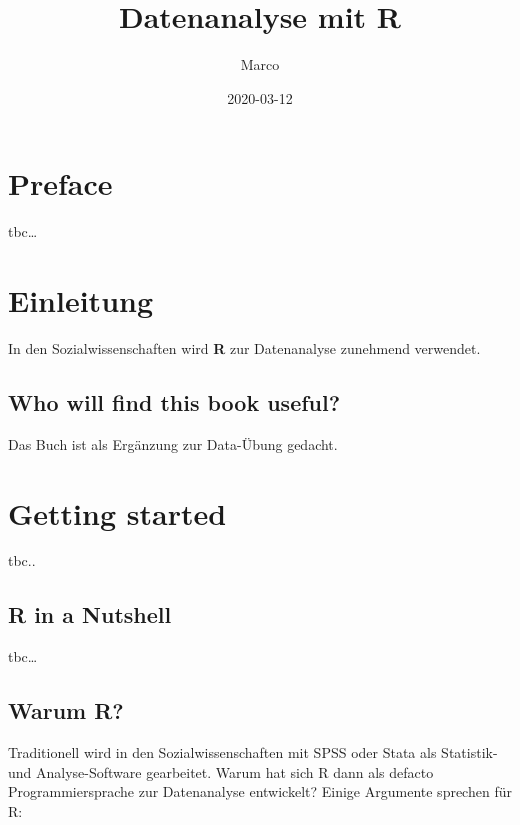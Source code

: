 \documentclass[
]{book}
\title{Datenanalyse mit R}
\author{Marco}
\date{2020-03-12}
\begin{document}
\maketitle

{
\setcounter{tocdepth}{1}
\tableofcontents
}
\hypertarget{preface}{%
\chapter*{Preface}\label{preface}}

tbc\ldots{}

\hypertarget{einleitung}{%
\chapter*{Einleitung}\label{einleitung}}

In den Sozialwissenschaften wird \textbf{R} zur Datenanalyse zunehmend verwendet.

\hypertarget{who-will-find-this-book-useful}{%
\section*{Who will find this book useful?}\label{who-will-find-this-book-useful}}

Das Buch ist als Ergänzung zur Data-Übung gedacht.

\hypertarget{getting-started}{%
\chapter{Getting started}\label{getting-started}}

tbc..

\hypertarget{r-in-a-nutshell}{%
\section{R in a Nutshell}\label{r-in-a-nutshell}}

tbc\ldots{}

\hypertarget{warum-r}{%
\section{Warum R?}\label{warum-r}}

Traditionell wird in den Sozialwissenschaften mit SPSS oder Stata als Statistik- und Analyse-Software gearbeitet. Warum hat sich R dann als defacto Programmiersprache zur Datenanalyse entwickelt? Einige Argumente sprechen für R:
\end{document}

